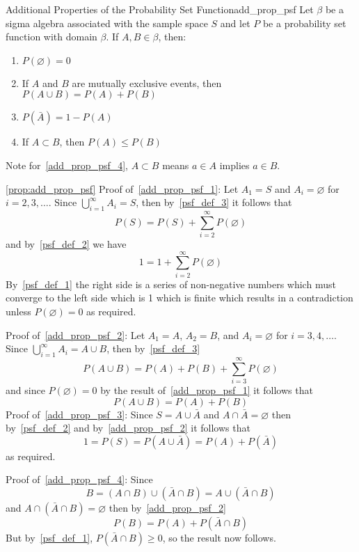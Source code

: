 \begin{Proposition}{Additional Properties of the Probability Set Function}{add_prop_psf}
    Let $ \beta $ be a sigma algebra associated with the sample space $ S $
    and let $ P $ be a probability set function with domain $ \beta $.
    If $ A,B\in \beta $, then:
    \begin{enumerate}[label=(\arabic*)]
        \item\label{add_prop_psf_1} $ P(\varnothing)=0 $
        \item\label{add_prop_psf_2} If $ A $ and $ B $ are mutually exclusive events, then $ P(A\cup B)=P(A)+P(B) $
        \item\label{add_prop_psf_3} $ P(\bar{A})=1-P(A) $
        \item\label{add_prop_psf_4} If $ A\subset B $, then $ P(A)\leqslant P(B) $
    \end{enumerate}
\end{Proposition}
Note for~\ref{add_prop_psf_4}, $ A\subset B $ means $ a\in A $ implies $ a\in B $.
\begin{Proof}{\ref{prop:add_prop_psf}}{}
    Proof of~\ref{add_prop_psf_1}: Let $ A_1=S $ and $ A_i=\varnothing $ for $ i=2,3,\ldots $.
    Since $ \bigcup\limits_{i=1}^{\infty}A_i=S $, then by~\ref{psf_def_3}
    it follows that
    \[ P(S)=P(S)+\sum\limits_{i=2}^{\infty} P(\varnothing) \]
    and by~\ref{psf_def_2} we have
    \[ 1=1+\sum\limits_{i=2}^{\infty}P(\varnothing) \]
    By~\ref{psf_def_1} the right side is a series of non-negative numbers which must converge to
    the left side which is 1 which is finite which results in a contradiction
    unless $ P(\varnothing)=0 $ as required.

    Proof of~\ref{add_prop_psf_2}: Let $ A_1=A $, $ A_2=B $, and $ A_i=\varnothing $ for
    $ i=3,4,\ldots $. Since $ \bigcup\limits_{i=1}^\infty A_i=A\cup B $, then by~\ref{psf_def_3}
    \[ P(A\cup B)=P(A)+P(B)+\sum\limits_{i=3}^{\infty} P(\varnothing) \]
    and since $ P(\varnothing)=0 $ by the result of~\ref{add_prop_psf_1} it follows that
    \[ P(A\cup B)=P(A)+P(B) \]
    Proof of~\ref{add_prop_psf_3}: Since $ S=A\cup \bar{A} $ and $ A\cap \bar{A}=\varnothing $
    then by~\ref{psf_def_2} and by~\ref{add_prop_psf_2} it follows that
    \[ 1=P(S)=P(A\cup\bar{A})=P(A)+P(\bar{A}) \]
    as required.

    Proof of~\ref{add_prop_psf_4}: Since
    \[ B=(A\cap B)\cup (\bar{A}\cap B)=A\cup(\bar{A}\cap B) \]
    and $ A\cap(\bar{A}\cap B)=\varnothing $ then by~\ref{add_prop_psf_2}
    \[ P(B)=P(A)+P(\bar{A}\cap B) \]
    But by~\ref{psf_def_1}, $ P(\bar{A}\cap B)\geqslant 0 $, so the result now follows.
\end{Proof}

